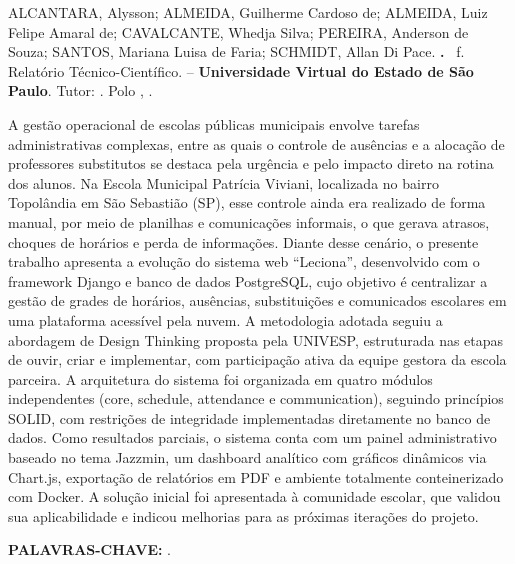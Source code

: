 ALCANTARA, Alysson; ALMEIDA, Guilherme Cardoso de; ALMEIDA, Luiz Felipe Amaral de;
CAVALCANTE, Whedja Silva; PEREIRA, Anderson de Souza; SANTOS, Mariana Luisa de Faria;
SCHMIDT, Allan Di Pace.
\textbf{\doctitulo.} \docpaginas~f. Relatório Técnico-Científico.
\doccurso{} -- \textbf{Universidade Virtual do Estado de São Paulo}.
Tutor: \doctutor. Polo \docpolo, \docano.

\vspace{3\baselineskip}


\vspace{\baselineskip}

\begin{singlespace}
A gestão operacional de escolas públicas municipais envolve tarefas administrativas complexas, entre as quais o controle de ausências e a alocação de professores substitutos se destaca pela urgência e pelo impacto direto na rotina dos alunos. Na Escola Municipal Patrícia Viviani, localizada no bairro Topolândia em São Sebastião (SP), esse controle ainda era realizado de forma manual, por meio de planilhas e comunicações informais, o que gerava atrasos, choques de horários e perda de informações. Diante desse cenário, o presente trabalho apresenta a evolução do sistema web ``Leciona'', desenvolvido com o framework Django e banco de dados PostgreSQL, cujo objetivo é centralizar a gestão de grades de horários, ausências, substituições e comunicados escolares em uma plataforma acessível pela nuvem. A metodologia adotada seguiu a abordagem de Design Thinking proposta pela UNIVESP, estruturada nas etapas de ouvir, criar e implementar, com participação ativa da equipe gestora da escola parceira. A arquitetura do sistema foi organizada em quatro módulos independentes (core, schedule, attendance e communication), seguindo princípios SOLID, com restrições de integridade implementadas diretamente no banco de dados. Como resultados parciais, o sistema conta com um painel administrativo baseado no tema Jazzmin, um dashboard analítico com gráficos dinâmicos via Chart.js, exportação de relatórios em PDF e ambiente totalmente conteinerizado com Docker. A solução inicial foi apresentada à comunidade escolar, que validou sua aplicabilidade e indicou melhorias para as próximas iterações do projeto.
\end{singlespace}

\vspace{2\baselineskip}

\noindent\textbf{PALAVRAS-CHAVE:} \docpalavraschave.

\clearpage
